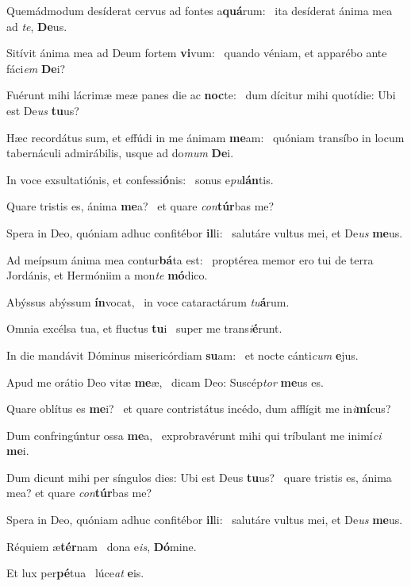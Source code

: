 \item Quemádmodum desíderat cervus ad fontes a\textbf{quá}rum:~\psstar{} ita desíderat ánima mea ad \textit{te}, \textbf{De}us.
\item Sitívit ánima mea ad Deum fortem \textbf{vi}vum:~\psstar{} quando véniam, et apparébo ante fáci\textit{em} \textbf{De}i?
\item Fuérunt mihi lácrimæ meæ panes die ac \textbf{noc}te:~\psstar{} dum dícitur mihi quotídie: Ubi est De\textit{us} \textbf{tu}us?
\item Hæc recordátus sum, et effúdi in me ánimam \textbf{me}am:~\psstar{} quóniam transíbo in locum tabernáculi admirábilis, usque ad do\textit{mum} \textbf{De}i.
\item In voce exsultatiónis, et confessi\textbf{ó}nis:~\psstar{} sonus e\textit{pu}\textbf{lán}tis.
\item Quare tristis es, ánima \textbf{me}a?~\psstar{} et quare \textit{con}\textbf{túr}bas me?
\item Spera in Deo, quóniam adhuc confitébor \textbf{il}li:~\psstar{} salutáre vultus mei, et De\textit{us} \textbf{me}us.
\item Ad meípsum ánima mea contur\textbf{bá}ta est:~\psstar{} proptérea memor ero tui de terra Jordánis, et Hermóniim a mon\textit{te} \textbf{mó}dico.
\item Abýssus abýssum \textbf{ín}vocat,~\psstar{} in voce cataractárum \textit{tu}\textbf{á}rum.
\item Omnia excélsa tua, et fluctus \textbf{tu}i~\psstar{} super me trans\textit{i}\textbf{é}runt.
\item In die mandávit Dóminus misericórdiam \textbf{su}am:~\psstar{} et nocte cánti\textit{cum} \textbf{e}jus.
\item Apud me orátio Deo vitæ \textbf{me}æ,~\psstar{} dicam Deo: Suscép\textit{tor} \textbf{me}us es.
\item Quare oblítus es \textbf{me}i?~\psstar{} et quare contristátus incédo, dum afflígit me in\textit{i}\textbf{mí}cus?
\item Dum confringúntur ossa \textbf{me}a,~\psstar{} exprobravérunt mihi qui tríbulant me inimí\textit{ci} \textbf{me}i.
\item Dum dicunt mihi per síngulos dies: Ubi est Deus \textbf{tu}us?~\psstar{} quare tristis es, ánima mea? et quare \textit{con}\textbf{túr}bas me?
\item Spera in Deo, quóniam adhuc confitébor \textbf{il}li:~\psstar{} salutáre vultus mei, et De\textit{us} \textbf{me}us.
\item Réquiem æ\textbf{tér}nam~\psstar{} dona e\textit{is}, \textbf{Dó}mine.
\item Et lux per\textbf{pé}tua~\psstar{} lúce\textit{at} \textbf{e}is.